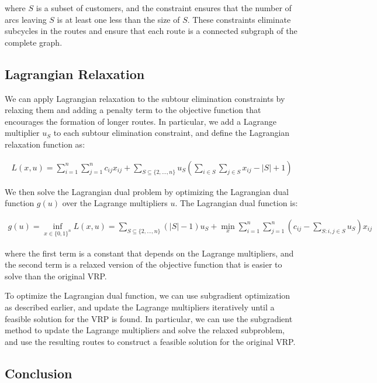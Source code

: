 where $S$ is a subset of customers, and the constraint ensures that the number of arcs leaving $S$ is at least one less than the size of $S$. These constraints eliminate subcycles in the routes and ensure that each route is a connected subgraph of the complete graph.

\subsection{Lagrangian Relaxation}

We can apply Lagrangian relaxation to the subtour elimination constraints by relaxing them and adding a penalty term to the objective function that encourages the formation of longer routes. In particular, we add a Lagrange multiplier $u_S$ to each subtour elimination constraint, and define the Lagrangian relaxation function as:

\begin{align*}
L(x,u) = \sum_{i=1}^n \sum_{j=1}^n c_{ij} x_{ij} + \sum_{S \subseteq \{2,\dots,n\}} u_S (\sum_{i \in S} \sum_{j \in S} x_{ij} - |S| + 1)
\end{align*}

We then solve the Lagrangian dual problem by optimizing the Lagrangian dual function $g(u)$ over the Lagrange multipliers $u$. The Lagrangian dual function is:

\begin{align*}
g(u) = \inf_{x \in \{0,1\}^n} L(x,u) = \sum_{S \subseteq \{2,\dots,n\}} (|S|-1)u_S + \min_{x} \sum_{i=1}^n \sum_{j=1}^n (c_{ij} - \sum_{S: i,j \in S} u_S) x_{ij}
\end{align*}

where the first term is a constant that depends on the Lagrange multipliers, and the second term is a relaxed version of the objective function that is easier to solve than the original VRP.

To optimize the Lagrangian dual function, we can use subgradient optimization as described earlier, and update the Lagrange multipliers iteratively until a feasible solution for the VRP is found. In particular, we can use the subgradient method to update the Lagrange multipliers and solve the relaxed subproblem, and use the resulting routes to construct a feasible solution for the original VRP.

\subsection{Conclusion}

